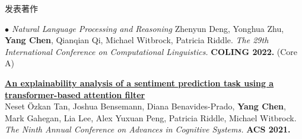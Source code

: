 \documentclass{resume} %
\begin{document}
\begin{rSection}{发表著作}
\begin{rSubsection}{\large\em $\bullet$ Natural Language Processing and Reasoning}{}{}{}
Zhenyun Deng, Yonghua Zhu, \textbf{Yang Chen}, Qianqian Qi, Michael Witbrock, Patricia Riddle. {\em The 29th International Conference on Computational Linguistics.} \textbf{COLING 2022.} (Core A)\\
\item {\href{https://advancesincognitivesystems.github.io/acs2021/data/ACS-21_paper_22.pdf}{\bf An explainability analysis of a sentiment prediction task using a transformer-based attention filter}}\\
		Neset \"{O}zkan Tan, Joshua Bensemann, Diana Benavides-Prado, \textbf{Yang Chen}, Mark Gahegan, Lia Lee, Alex Yuxuan Peng, Patricia Riddle, Michael Witbrock. {\em The Ninth Annual Conference on Advances in Cognitive Systems.} \textbf{ACS 2021.}\\
\end{rSubsection}



\end{rSection}
\end{document}
